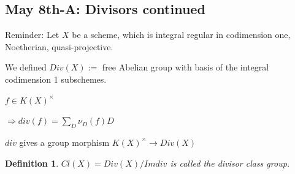 \documentclass[11pt]{article}
\newtheorem{dfn}[thm]{Definition}
\newcommand{\Lrta}{\Longrightarrow}
\newcommand{\lrta}{\longrightarrow}
\begin{document}
\subsection{May 8th-A: Divisors continued}

Reminder:
 Let $X$ be a scheme, which is integral regular in codimension one, Noetherian, quasi-projective.

 We defined $Div(X):=$ free Abelian group with basis of the integral codimension 1 subschemes.

 $f\in K(X)^\times$

 $\Lrta div(f)=\sum_D \nu_D(f)D$
 
 $div$ gives a group morphism $K(X)^\times\lrta Div(X)$

\begin{dfn}
$Cl(X)=Div(X)/Im div$ is called the divisor class group.
\end{dfn}
\end{document}
